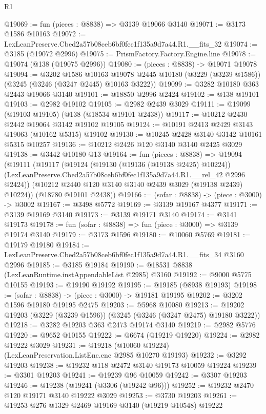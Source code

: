 \begin{lexlean}{R1}
\begin{coremodule}
@19069 := fun (pieces : @8838) => @3139 @19066 @3140
@19071 := @3173 @1586 @10163
@19072 := LexLeanPreserve.Cbed2a57b08ceb6bf0fec1f135a9d7a44.R1.__fits_32
@19074 := @3185 (@19072 @2996)
@19075 := PrismFactory.Factory.Engine.line
@19078 := @19074 (@138 (@19075 @2996))
@19080 := (pieces : @8838) -> @19071 @19078
@19094 := @3202
    @1586
    @10163
    @19078
    @2445
    @10180
    (@3229 (@3239 @1586))
    (@3245 (@3246 (@3247 @2445) @10163 @3222))
@19099 := @3282 @10180 @363 @2443 @19066 @3140
@19101 := @18850 @2996 @2424
@19102 := @138 @19101
@19103 := @2982 @19102
@19105 := @2982 @2439 @3029
@19111 := @19099 (@19103 @19105) (@138 (@18534 @19101 @2438))
@19117 := @10212 @2430 @2442 @19064 @3142 @19102 @19105
@19124 := @10191 @2413 @2429 @3143 @19063 (@10162 @5315) @19102
@19130 := @10245 @2428 @3140 @3142 @10161 @5315 @10257
@19136 := @10212 @2426 @120 @3140 @3140 @2425 @3029
@19138 := @3442 @10180 @13
@19164 := fun (pieces : @8838) =>
  @19094
    (@19111
      (@19117
        (@19124
          (@19130 (@19136 (@19138 @2425) @10224))
          (LexLeanPreserve.Cbed2a57b08ceb6bf0fec1f135a9d7a44.R1.__rel_42 @2996 @2424))
        (@10212 @2440 @120 @3140 @3140 @2439 @3029 (@19138 @2439) @10224))
      (@18780 @19101 @2438))
@19166 := (sofar : @8838) -> (piece : @3000) -> @3002
@19167 := @3498 @5772
@19169 := @3139 @19167 @4377
@19171 := @3139 @19169 @3140
@19173 := @3139 @19171 @3140
@19174 := @3141 @19173
@19178 := fun (sofar : @8838) => fun (piece : @3000) => @3139 @19174 @3140
@19179 := @3173 @1596
@19180 := @10060 @5769
@19181 := @19179 @19180
@19184 := LexLeanPreserve.Cbed2a57b08ceb6bf0fec1f135a9d7a44.R1.__fits_34 @3160 @2996
@19185 := @3185 @19184
@19190 := @18531 @8838 (LexLeanRuntime.instAppendableList @2985) @3160
@19192 := @9000 @5775 @10155
@19193 := @19190 @19192
@19195 := @19185 (@8938 @19193)
@19198 := (sofar : @8838) -> (piece : @3000) -> @19181 @19195
@19202 := @3202 @1596 @19180 @19195 @2475
@19203 := @5968 @10080
@19213 := @19202 @19203 (@3229 (@3239 @1596)) (@3245 (@3246 (@3247 @2475) @19180 @3222))
@19218 := @3282 @19203 @363 @2473 @19174 @3140
@19219 := @2982 @5776
@19220 := @9652 @10155
@19222 := @6674 (@19219 @19220)
@19224 := @2982 @19222 @3029
@19231 := @19218 (@10060 @19224) (LexLeanPreservation.ListEnc.enc @2985 @10270 @19193)
@19232 := @3292 @19203
@19238 := @19232 @118 @2472 @3140 @19173 @10059 @19224
@19239 := @3301 @19203
@19241 := @19239 @96 @10059
@19242 := @3307 @19203
@19246 := @19238 (@19241 (@3306 (@19242 @96)))
@19252 := @19232 @2470 @120 @19171 @3140 @19222 @3029
@19253 := @3730 @19203
@19261 := @19253 @276 @1329 @2469 @19169 @3140 (@19219 @10548) @19222

\end{coremodule}
\end{lexlean}
